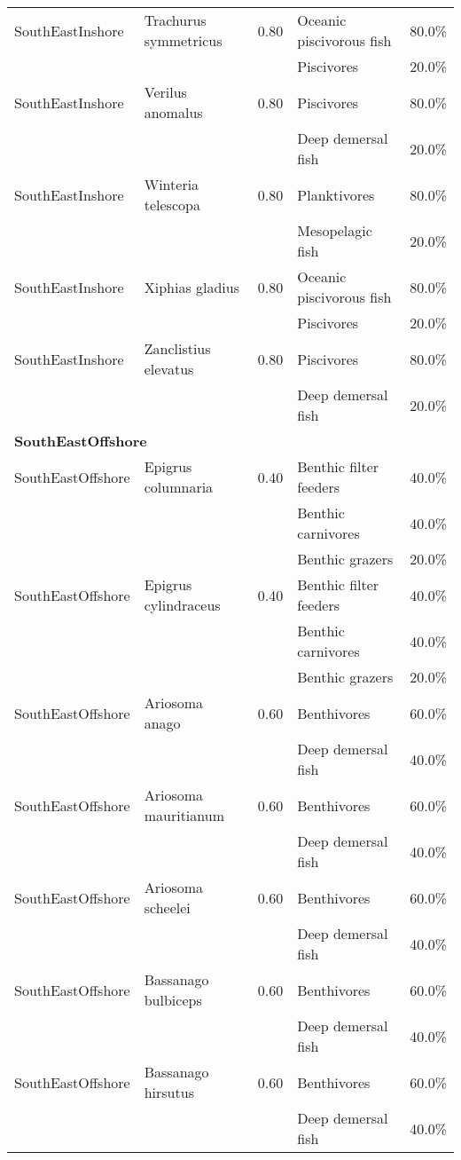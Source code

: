 \begin{longtable}{llcll}
SouthEastInshore & Trachurus symmetricus & 0.80 & Oceanic piscivorous fish & 80.0\% \\
& & & Piscivores & 20.0\% \\
\hline
SouthEastInshore & Verilus anomalus & 0.80 & Piscivores & 80.0\% \\
& & & Deep demersal fish & 20.0\% \\
\hline
SouthEastInshore & Winteria telescopa & 0.80 & Planktivores & 80.0\% \\
& & & Mesopelagic fish & 20.0\% \\
\hline
SouthEastInshore & Xiphias gladius & 0.80 & Oceanic piscivorous fish & 80.0\% \\
& & & Piscivores & 20.0\% \\
\hline
SouthEastInshore & Zanclistius elevatus & 0.80 & Piscivores & 80.0\% \\
& & & Deep demersal fish & 20.0\% \\
\hline
\hline
\multicolumn{5}{l}{\textbf{SouthEastOffshore}} \\
\hline
SouthEastOffshore & Epigrus columnaria & 0.40 & Benthic filter feeders & 40.0\% \\
& & & Benthic carnivores & 40.0\% \\
& & & Benthic grazers & 20.0\% \\
\hline
SouthEastOffshore & Epigrus cylindraceus & 0.40 & Benthic filter feeders & 40.0\% \\
& & & Benthic carnivores & 40.0\% \\
& & & Benthic grazers & 20.0\% \\
\hline
SouthEastOffshore & Ariosoma anago & 0.60 & Benthivores & 60.0\% \\
& & & Deep demersal fish & 40.0\% \\
\hline
SouthEastOffshore & Ariosoma mauritianum & 0.60 & Benthivores & 60.0\% \\
& & & Deep demersal fish & 40.0\% \\
\hline
SouthEastOffshore & Ariosoma scheelei & 0.60 & Benthivores & 60.0\% \\
& & & Deep demersal fish & 40.0\% \\
\hline
SouthEastOffshore & Bassanago bulbiceps & 0.60 & Benthivores & 60.0\% \\
& & & Deep demersal fish & 40.0\% \\
\hline
SouthEastOffshore & Bassanago hirsutus & 0.60 & Benthivores & 60.0\% \\
& & & Deep demersal fish & 40.0\% \\

\end{longtable}
